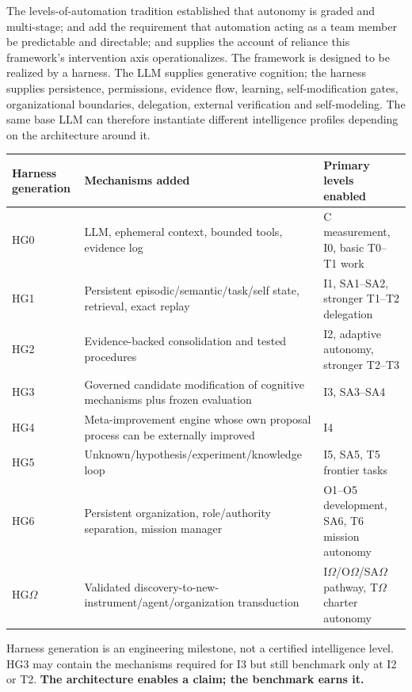 \documentclass[11pt]{article}
\theoremstyle{definition}
\newcommand{\Om}{\ensuremath{\Omega}}
\begin{document}
The levels-of-automation tradition \citep{sheridan1978,parasuraman2000,endsley1999} established that autonomy is graded and multi-stage; \citet{klein2004} and \citet{amershi2019} add the requirement that automation acting as a team member be predictable and directable; and \citet{lee2004} supplies the account of reliance this framework's intervention axis operationalizes. The framework is designed to be realized by a harness. The LLM supplies generative cognition; the harness supplies persistence, permissions, evidence flow, learning, self-modification gates, organizational boundaries, delegation, external verification and self-modeling. The same base LLM can therefore instantiate different intelligence profiles depending on the architecture around it.

\begin{table}[h]
\centering\small
\begin{tabularx}{\textwidth}{@{}lYY@{}}
\toprule
Harness generation & Mechanisms added & Primary levels enabled \\
\midrule
HG0 & LLM, ephemeral context, bounded tools, evidence log & C measurement, I0, basic T0--T1 work \\
HG1 & Persistent episodic/semantic/task/self state, retrieval, exact replay & I1, SA1--SA2, stronger T1--T2 delegation \\
HG2 & Evidence-backed consolidation and tested procedures & I2, adaptive autonomy, stronger T2--T3 \\
HG3 & Governed candidate modification of cognitive mechanisms plus frozen evaluation & I3, SA3--SA4 \\
HG4 & Meta-improvement engine whose own proposal process can be externally improved & I4 \\
HG5 & Unknown/hypothesis/experiment/knowledge loop & I5, SA5, T5 frontier tasks \\
HG6 & Persistent organization, role/authority separation, mission manager & O1--O5 development, SA6, T6 mission autonomy \\
HG\Om{} & Validated discovery-to-new-instrument/agent/organization transduction & I\Om{}/O\Om{}/SA\Om{} pathway, T\Om{} charter autonomy \\
\bottomrule
\end{tabularx}
\end{table}

Harness generation is an engineering milestone, not a certified intelligence level. HG3 may contain the mechanisms required for I3 but still benchmark only at I2 or T2. \textbf{The architecture enables a claim; the benchmark earns it.}
\end{document}
